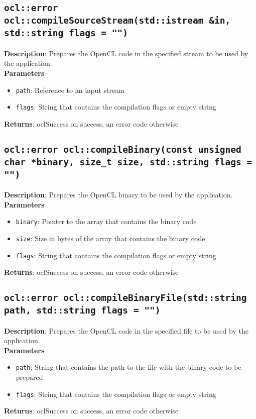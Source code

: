 \subsection{\texttt{ocl::error ocl::compileSourceStream(std::istream \&in, std::string flags = "")}}

\textbf{Description}: Prepares the OpenCL code in the specified stream to be used by the 
application.  \\
\textbf{Parameters}
\begin{itemize}
  \item \texttt{path}: Reference to an input stream
  \item \texttt{flags}: String that contains the compilation flags or empty string
\end{itemize}
\textbf{Returns}: oclSuccess on success, an error code otherwise

\subsection{\texttt{ocl::error ocl::compileBinary(const unsigned char *binary, size\_t size, 
std::string flags = "")}}

\textbf{Description}: Prepares the OpenCL binary to be used by the application.  \\
\textbf{Parameters}
\begin{itemize}
  \item \texttt{binary}: Pointer to the array that contains the binary code
  \item \texttt{size}: Size in bytes of the array that contains the binary code
  \item \texttt{flags}: String that contains the compilation flags or empty string
\end{itemize}
\textbf{Returns}: oclSuccess on success, an error code otherwise

\subsection{\texttt{ocl::error ocl::compileBinaryFile(std::string path, std::string flags = "")}}

\textbf{Description}: Prepares the OpenCL code in the specified file to be used by the application.  \\
\textbf{Parameters}
\begin{itemize}
  \item \texttt{path}: String that contains the path to the file with the binary code to be prepared
  \item \texttt{flags}: String that contains the compilation flags or empty string
\end{itemize}
\textbf{Returns}: oclSuccess on success, an error code otherwise

